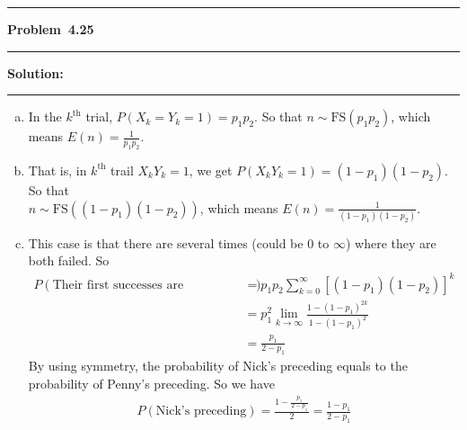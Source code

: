\documentclass[10.5pt]{article}
\newcommand\question[1]{\vspace{.2in}\hrule\vspace{0.04in}\textbf{Problem\ #1}\vspace{.4em}\hrule\vspace{.10in}}
\newcommand\Solution{\vspace{.3in}\textbf{Solution:}\vspace{.5em}\hrule\vspace{.08in}\par}
\begin{document}
\question{4.25}
	\Solution{}
	\begin{enumerate}[(a)]
		\item In the $k^{\text{th}}$ trial, $P(X_k = Y_k = 1) = p_1p_2$.
		So that $n\sim\text{FS}(p_1p_2)$, which means $E(n) = \frac{1}{p_1p_2}$.\vspace{1cm}
		\item That is, in $k^{\text{th}}$ trail $X_kY_k = 1$, we get $P(X_kY_k = 1) = (1-p_1)(1-p_2)$. So that\\
		$n\sim\text{FS}((1-p_1)(1-p_2))$, which means $E(n) = \frac{1}{(1-p_1)(1-p_2)}$.\vspace{1cm}
		\item This case is that there are several times (could be $0$ to $\infty$) where they are both failed.
		So \begin{align*}
			P(\text{Their first successes are simultaneous}) 
			&= p_1p_2\sum_{k = 0}^{\infty}\left[(1-p_1)(1-p_2)\right]^k\\[6pt]
			&=p_1^2\lim_{k\to\infty}\frac{1-(1-p_1)^{2k}}{1-(1-p_1)^2}\\[6pt]
			&=\frac{p_1}{2-p_1}
		\end{align*}
		By using symmetry, the probability of Nick's preceding equals to the probability of Penny's preceding.
		So we have\begin{align*}
			P(\text{Nick's preceding}) = \frac{1-\frac{p_1}{2-p_1}}{2} = \frac{1-p_1}{2-p_1}
		\end{align*}
	\end{enumerate}

\pagebreak
\end{document}

